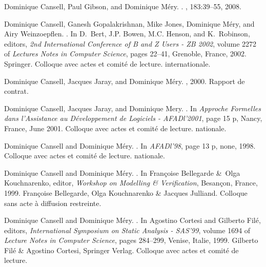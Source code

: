 \documentclass[ 12pt]{article}
\begin{document}
\begin{thebibliography}{100}
Dominique Cansell, Paul Gibson, and Dominique M{\'e}ry.
.
, 183:39--55,
  2008.

Dominique Cansell, Ganesh Gopalakrishnan, Mike Jones, Dominique M{\'e}ry, and
  Airy Weinzoepflen.
.
\newblock In D.~Bert, J.P. Bowen, M.C. Henson, and K.~Robinson, editors, {\em
  {2nd International Conference of B and Z Users - ZB 2002}}, volume 2272 of
  {\em Lectures Notes in Computer Science}, pages 22--41, Grenoble, France,
  2002. {Springer}.
\newblock Colloque avec actes et comit{\'e} de lecture. internationale.

Dominique Cansell, Jacques Jaray, and Dominique M{\'e}ry.
, 2000.
\newblock Rapport de contrat.

Dominique Cansell, Jacques Jaray, and Dominique Mery.
.
\newblock In {\em {Approche Formelles dans l'Assistance au D{\'e}veloppement de
  Logiciels - AFADl'2001}}, page 15 p, Nancy, France, June 2001.
\newblock Colloque avec actes et comit{\'e} de lecture. nationale.

Dominique Cansell and Dominique M{\'e}ry.
.
\newblock In {\em {AFADl'98}}, page 13 p, none, 1998.
\newblock Colloque avec actes et comit{\'e} de lecture. nationale.

Dominique Cansell and Dominique M{\'e}ry.
.
\newblock In Fran{\c c}oise Bellegarde \&~Olga Kouchnarenko, editor, {\em
  {Workshop on Modelling \& Verification}}, Besan{\c c}on, France, 1999.
  {Fran{\c c}oise Bellegarde, Olga Kouchnarenko \& Jacques Julliand}.
\newblock Colloque sans acte {\`a} diffusion restreinte.

Dominique Cansell and Dominique M{\'e}ry.
.
\newblock In Agostino Cortesi and Gilberto Fil{{\'e}}, editors, {\em
  {International Symposium on Static Analysis - SAS'99}}, volume 1694 of {\em
  Lecture Notes in Computer Science}, pages 284--299, Venise, Italie, 1999.
  {Gilberto Fil{{\'e}} \& Agostino Cortesi}, {Springer Verlag}.
\newblock Colloque avec actes et comit{\'e} de lecture.


\end{thebibliography}
\end{document}
